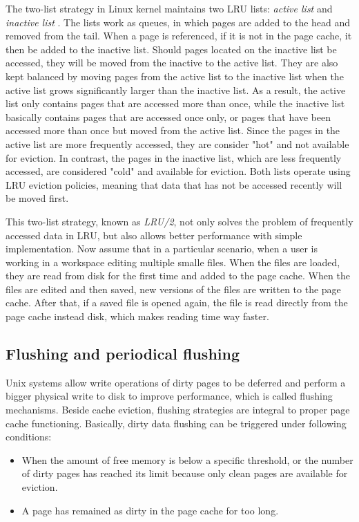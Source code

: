 The two-list strategy in Linux kernel maintains two LRU lists: 
\textit{active list} and \textit{inactive list} 
\cite{linuxdev3rd2010,bovet2005understanding}.
The lists work as queues, in which pages are added to the head and 
removed from the tail.
When a page is referenced, if it is not in the page cache, it then be added 
to the inactive list.
Should pages located on the inactive list be accessed, they will be moved 
from the inactive to the active list. 
They are also kept balanced by moving pages from the active list to the 
inactive list when the active list grows significantly larger than the 
inactive list.
As a result, the active list only contains pages that are accessed more 
than once, while the inactive list basically contains pages that are accessed 
once only, or pages that have been accessed more than once but moved 
from the active list.
Since the pages in the active list are more frequently accessed, they are 
consider "hot" and not available for eviction. In contrast, the pages in the 
inactive list, which are less frequently accessed, are considered "cold" 
and available for eviction.
Both lists operate using LRU eviction policies, meaning that data that has
not be accessed recently will be moved first.

This two-list strategy, known as \textit{LRU/2}, not only solves the problem 
of frequently accessed data in LRU, but also allows better performance with 
simple implementation. 
Now assume that in a particular scenario, when a user is working in a 
workspace editing multiple smalle files. When the files are loaded, they are 
read from disk for the first time and added to the page cache. 
When the files are edited and then saved, new versions of the files are 
written to the page cache.
After that, if a saved file is opened again, the file is read directly from 
the page cache instead disk, which makes reading time way faster. 

\subsection{Flushing and periodical flushing}

Unix systems allow write operations of dirty pages to be deferred and perform 
a bigger physical write to disk to improve performance, which is called flushing 
mechanisms. Beside cache eviction, flushing strategies are integral to proper 
page cache functioning.
Basically, dirty data flushing can be triggered under following conditions:

\begin{itemize}
    \item When the amount of free memory is below a specific threshold, or the 
    number of dirty pages has reached its limit because only clean pages are 
    available for eviction.
    \item A page has remained as dirty in the page cache for too long. 
\end{itemize}

